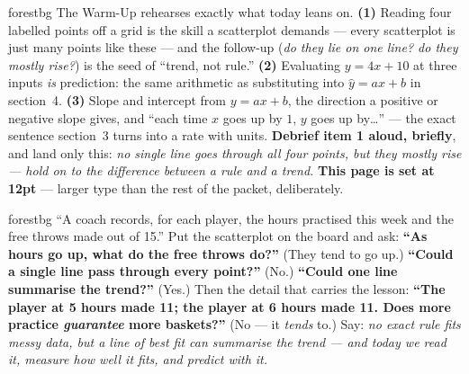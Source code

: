 \documentclass[10pt]{article}
\begin{document}
\begin{fixedskillbox}{forestbg}
The Warm-Up rehearses exactly what today leans on. \textbf{(1)} Reading four labelled points off
a grid is the skill a scatterplot demands --- every scatterplot is just many points like these ---
and the follow-up (\emph{do they lie on one line? do they mostly rise?}) is the seed of
``trend, not rule.'' \textbf{(2)} Evaluating $y=4x+10$ at three inputs \emph{is} prediction: the
same arithmetic as substituting into $\hat y=ax+b$ in section~4. \textbf{(3)} Slope and intercept
from $y=ax+b$, the direction a positive or negative slope gives, and ``each time $x$ goes up by
$1$, $y$ goes up by\dots'' --- the exact sentence section~3 turns into a rate with units.
\textbf{Debrief item 1 aloud, briefly}, and land only this: \emph{no single line goes through all
four points, but they mostly rise --- hold on to the difference between a rule and a trend.}
\textbf{This page is set at 12pt} --- larger type than the rest of the packet, deliberately.
\end{fixedskillbox}

\begin{skillbox}[Hook]{forestbg}
    ``A coach records, for each player, the hours practised this week and the free throws made out
    of 15.'' Put the scatterplot on the board and ask: \textbf{``As hours go up, what do the free
    throws do?''} (They tend to go up.) \textbf{``Could a single line pass through every
    point?''} (No.) \textbf{``Could one line summarise the trend?''} (Yes.) Then the detail that
    carries the lesson: \textbf{``The player at 5 hours made 11; the player at 6 hours made 11.
    Does more practice \emph{guarantee} more baskets?''} (No --- it \emph{tends} to.) Say:
    \emph{no exact rule fits messy data, but a line of best fit can summarise the trend --- and
    today we read it, measure how well it fits, and predict with it.}
\end{skillbox}
\end{document}
